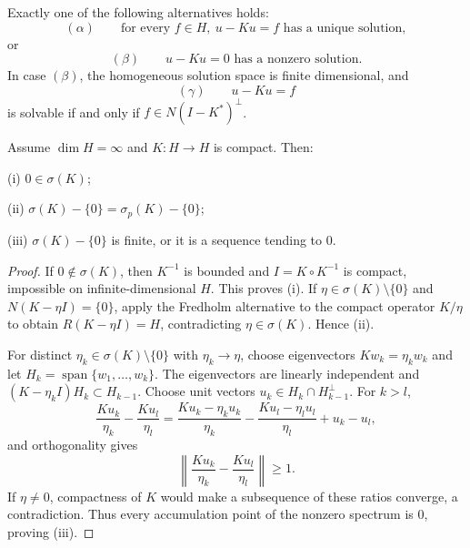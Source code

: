 \begin{remark}
\label{rem:fredholm-alternative-dichotomy}

Exactly one of the following alternatives holds:
\[
(\alpha)\qquad
\text{for every }f\in H,\ u-Ku=f
\text{ has a unique solution},
\]
or
\[
(\beta)\qquad
u-Ku=0\text{ has a nonzero solution}.
\]
In case $(\beta)$, the homogeneous solution space is finite dimensional, and
\[
(\gamma)\qquad u-Ku=f
\]
is solvable if and only if $f\in N(I-K^*)^\perp$.
\end{remark}

\begin{theorem}
\label{thm:spectrum-of-compact-operator}

Assume $\dim H=\infty$ and $K:H\to H$ is compact. Then:

(i) $0\in\sigma(K)$;

(ii) $\sigma(K)-\{0\}=\sigma_p(K)-\{0\}$;

(iii) $\sigma(K)-\{0\}$ is finite, or it is a sequence tending to $0$.
\end{theorem}
\begin{proof}
\sketch If $0\notin\sigma(K)$, then $K^{-1}$ is bounded and $I=K\circ K^{-1}$ is compact, impossible on infinite-dimensional $H$. This proves (i). If $\eta\in\sigma(K)\setminus\{0\}$ and $N(K-\eta I)=\{0\}$, apply the Fredholm alternative to the compact operator $K/\eta$ to obtain $R(K-\eta I)=H$, contradicting $\eta\in\sigma(K)$. Hence (ii).

For distinct $\eta_k\in\sigma(K)\setminus\{0\}$ with $\eta_k\to\eta$, choose eigenvectors $Kw_k=\eta_kw_k$ and let $H_k=\operatorname{span}\{w_1,\ldots,w_k\}$. The eigenvectors are linearly independent and $(K-\eta_kI)H_k\subset H_{k-1}$. Choose unit vectors $u_k\in H_k\cap H_{k-1}^\perp$. For $k>l$,
\[
\frac{Ku_k}{\eta_k}-\frac{Ku_l}{\eta_l}
=\frac{Ku_k-\eta_ku_k}{\eta_k}
-\frac{Ku_l-\eta_lu_l}{\eta_l}
+u_k-u_l,
\]
and orthogonality gives
\[
\left\|\frac{Ku_k}{\eta_k}-\frac{Ku_l}{\eta_l}\right\|\geq1.
\]
If $\eta\ne0$, compactness of $K$ would make a subsequence of these ratios converge, a contradiction. Thus every accumulation point of the nonzero spectrum is $0$, proving (iii).
\end{proof}

